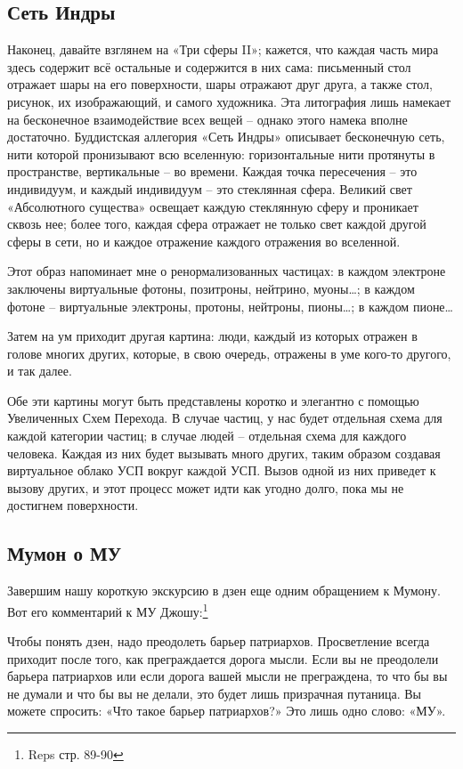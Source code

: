 \documentclass[../main.tex]{subfiles}
\begin{document}
\subsection{Сеть Индры}

Наконец, давайте взглянем на «Три сферы II»; кажется, что каждая часть мира здесь содержит всё остальные и содержится в них сама: письменный стол отражает шары на его поверхности, шары отражают друг друга, а также стол, рисунок, их изображающий, и самого художника. Эта литография лишь намекает на бесконечное взаимодействие всех вещей \--- однако этого намека вполне достаточно. Буддистская аллегория «Сеть Индры» описывает бесконечную сеть, нити которой пронизывают всю вселенную: горизонтальные нити протянуты в пространстве, вертикальные \--- во времени. Каждая точка пересечения \--- это индивидуум, и каждый индивидуум \--- это стеклянная сфера. Великий свет «Абсолютного существа» освещает каждую стеклянную сферу и проникает сквозь нее; более того, каждая сфера отражает не только свет каждой другой сферы в сети, но и каждое отражение каждого отражения во вселенной.

Этот образ напоминает мне о ренормализованных частицах: в каждом электроне заключены виртуальные фотоны, позитроны, нейтрино, муоны\ldots; в каждом фотоне \--- виртуальные электроны, протоны, нейтроны, пионы\ldots; в каждом пионе\ldots{}

Затем на ум приходит другая картина: люди, каждый из которых отражен в голове многих других, которые, в свою очередь, отражены в уме кого-то другого, и так далее.

Обе эти картины могут быть представлены коротко и элегантно с помощью Увеличенных Схем Перехода. В случае частиц, у нас будет отдельная схема для каждой категории частиц; в случае людей \--- отдельная схема для каждого человека. Каждая из них будет вызывать много других, таким образом создавая виртуальное облако УСП вокруг каждой УСП\@. Вызов одной из них приведет к вызову других, и этот процесс может идти как угодно долго, пока мы не достигнем поверхности.


\subsection{Мумон о МУ}

Завершим нашу короткую экскурсию в дзен еще одним обращением к Мумону. Вот его комментарий к МУ Джошу:\footnote{Reps стр. 89-90}

Чтобы понять дзен, надо преодолеть барьер патриархов. Просветление всегда приходит после того, как преграждается дорога мысли. Если вы не преодолели барьера патриархов или если дорога вашей мысли не преграждена, то что бы вы не думали и что бы вы не делали, это будет лишь призрачная путаница. Вы можете спросить: «Что такое барьер патриархов?» Это лишь одно слово: «МУ».
\end{document}
